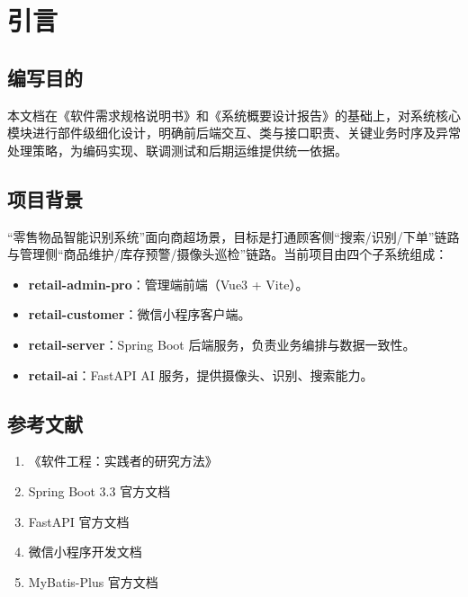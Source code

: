 
\setcounter{section}{0}
\renewcommand{\thesection}{\arabic{section}}
\renewcommand{\thesubsection}{\thesection.\arabic{subsection}}
\renewcommand{\thesubsubsection}{\thesubsection.\arabic{subsubsection}}

\section{引言}

\subsection{编写目的}
本文档在《软件需求规格说明书》和《系统概要设计报告》的基础上，对系统核心模块进行部件级细化设计，明确前后端交互、类与接口职责、关键业务时序及异常处理策略，为编码实现、联调测试和后期运维提供统一依据。

\subsection{项目背景}
“零售物品智能识别系统”面向商超场景，目标是打通顾客侧“搜索/识别/下单”链路与管理侧“商品维护/库存预警/摄像头巡检”链路。当前项目由四个子系统组成：
\begin{itemize}[leftmargin=2em]
  \item \textbf{retail-admin-pro}：管理端前端（Vue3 + Vite）。
  \item \textbf{retail-customer}：微信小程序客户端。
  \item \textbf{retail-server}：Spring Boot 后端服务，负责业务编排与数据一致性。
  \item \textbf{retail-ai}：FastAPI AI 服务，提供摄像头、识别、搜索能力。
\end{itemize}

\subsection{参考文献}
\begin{enumerate}[leftmargin=2em]
  \item 《软件工程：实践者的研究方法》
  \item Spring Boot 3.3 官方文档
  \item FastAPI 官方文档
  \item 微信小程序开发文档
  \item MyBatis-Plus 官方文档
\end{enumerate}

